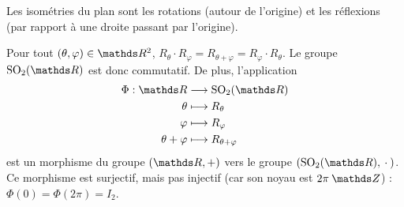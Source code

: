 \begin{crlr}
	Les isométries du plan sont les rotations (autour de l'origine) et les réflexions (par rapport à une droite passant par l'origine).
\end{crlr}

\begin{rmk}
	Pour tout $(\theta, \varphi) \in \R^2$, $R_\theta \cdot R_\varphi = R_{\theta + \varphi} = R_\varphi \cdot R_\theta$.
	Le groupe $\mathrm{SO}_2(\R)$\/ est donc commutatif.
	De plus, l'application \begin{align*}
		\Phi: \R &\longrightarrow \mathrm{SO}_2(\R) \\
		\theta &\longmapsto R_\theta\\
		\varphi &\longmapsto R_\varphi\\
		\theta + \varphi &\longmapsto R_{\theta + \varphi}
	\end{align*}
	est un morphisme du groupe $(\R, +)$\/ vers le groupe $(\mathrm{SO}_2(\R),\:\cdot\:)$.
	Ce morphisme est surjectif, mais pas injectif (car son noyau est $2\pi\:\Z$) : $\Phi(0) = \Phi(2\pi) = I_2$.


\end{rmk}
